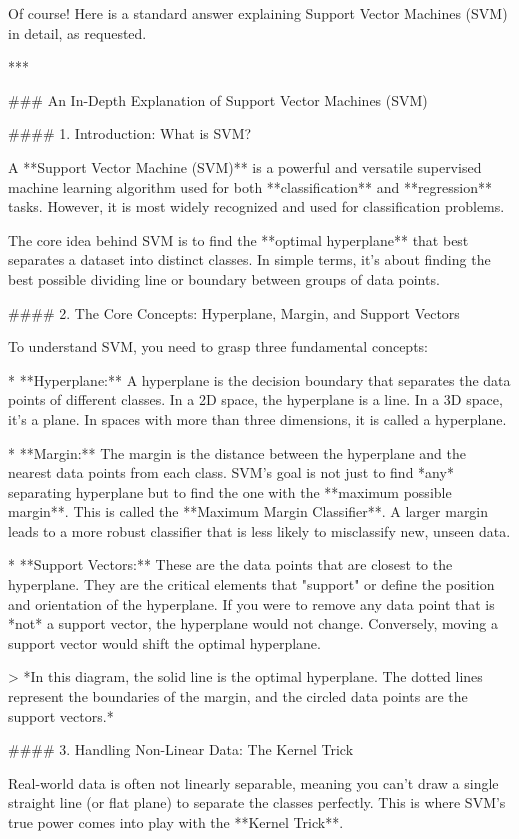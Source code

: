 \documentclass{article}
\begin{document}
Of course! Here is a standard answer explaining Support Vector Machines (SVM) in detail, as requested.

***

### An In-Depth Explanation of Support Vector Machines (SVM)

#### 1. Introduction: What is SVM?

A **Support Vector Machine (SVM)** is a powerful and versatile supervised machine learning algorithm used for both **classification** and **regression** tasks. However, it is most widely recognized and used for classification problems.

The core idea behind SVM is to find the **optimal hyperplane** that best separates a dataset into distinct classes. In simple terms, it's about finding the best possible dividing line or boundary between groups of data points.

#### 2. The Core Concepts: Hyperplane, Margin, and Support Vectors

To understand SVM, you need to grasp three fundamental concepts:

*   **Hyperplane:** A hyperplane is the decision boundary that separates the data points of different classes. In a 2D space, the hyperplane is a line. In a 3D space, it's a plane. In spaces with more than three dimensions, it is called a hyperplane.

*   **Margin:** The margin is the distance between the hyperplane and the nearest data points from each class. SVM's goal is not just to find *any* separating hyperplane but to find the one with the **maximum possible margin**. This is called the **Maximum Margin Classifier**. A larger margin leads to a more robust classifier that is less likely to misclassify new, unseen data.

*   **Support Vectors:** These are the data points that are closest to the hyperplane. They are the critical elements that "support" or define the position and orientation of the hyperplane. If you were to remove any data point that is *not* a support vector, the hyperplane would not change. Conversely, moving a support vector would shift the optimal hyperplane.



> *In this diagram, the solid line is the optimal hyperplane. The dotted lines represent the boundaries of the margin, and the circled data points are the support vectors.*

#### 3. Handling Non-Linear Data: The Kernel Trick

Real-world data is often not linearly separable, meaning you can't draw a single straight line (or flat plane) to separate the classes perfectly. This is where SVM's true power comes into play with the **Kernel Trick**.
\end{document}
